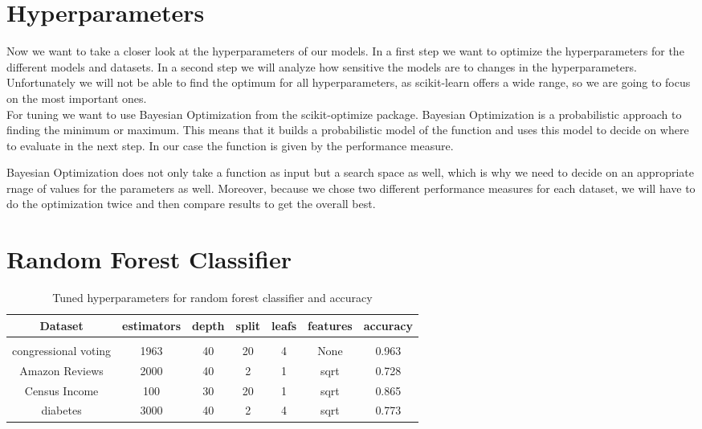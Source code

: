 \documentclass[a4paper,12pt]{article}
\begin{document}
\section{Hyperparameters}
Now we want to take a closer look at the hyperparameters of our models. In a first step we want to optimize the hyperparameters for the different models and datasets.
In a second step we will analyze how sensitive the models are to changes in the hyperparameters. Unfortunately we will not be able to find the optimum for all hyperparameters, as scikit-learn offers a wide range, so we are going to focus on the most important ones.\\

For tuning we want to use Bayesian Optimization from the scikit-optimize package. Bayesian Optimization is a probabilistic approach to finding the minimum or maximum. This means that it builds a probabilistic model of the function and uses this model to decide on where to evaluate in the next step. In our case the function is given by the performance measure. 

Bayesian Optimization does not only take a function as input but a search space as well, which is why we need to decide on an appropriate rnage of values for the parameters as well. Moreover, because we chose two different performance measures for each dataset, we will have to do the optimization twice and then compare results to get the overall best.

\section{Random Forest Classifier}  

\begin{table}[h!]
    \centering
    \begin{tabular}{|c|c|c|c|c|c|c|}
    \hline
    Dataset & \textbf{estimators} & \textbf{depth} & \textbf{split} & \textbf{leafs} & \textbf{features} & accuracy \\
    \hline
    \multicolumn{7}{c}{\vspace{-0.4cm}} \\ %
    \hline
    congressional voting & 1963 & 40 & 20 & 4 & None & 0.963 \\%
    \hline
    Amazon Reviews & 2000 & 40 & 2 & 1 & sqrt & 0.728 \\%
    \hline
    Census Income & 100 & 30 & 20 & 1 & sqrt & 0.865 \\%
    \hline
    diabetes & 3000 & 40 & 2 & 4 & sqrt & 0.773 \\%
    \hline
    \end{tabular}
    \caption{Tuned hyperparameters for random forest classifier and accuracy} 
    \label{table:tu_hyp_rf_ac}
    \end{table}
\end{document}
